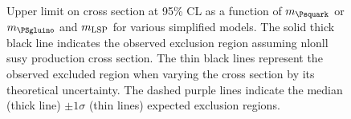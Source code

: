 \begin{figure}[h!]
  \begin{center}
     \\
     \\
     \\
    \caption{\label{fig:limits-sms}Upper limit on cross section at
      95\% CL as a function of $m_{\Psquark}$ or $m_{\PSgluino}$ and $m_{\rm
        LSP}$ for various simplified models. The solid thick black
      line indicates the observed exclusion region assuming \ac{nlonll}
      \ac{susy} production cross section. The thin black lines represent
      the observed excluded region when varying the cross section by
      its theoretical uncertainty. The dashed purple lines indicate
      the median (thick line) $\pm 1 \sigma$ (thin lines) expected
      exclusion regions.  }
  \end{center}
\end{figure}

